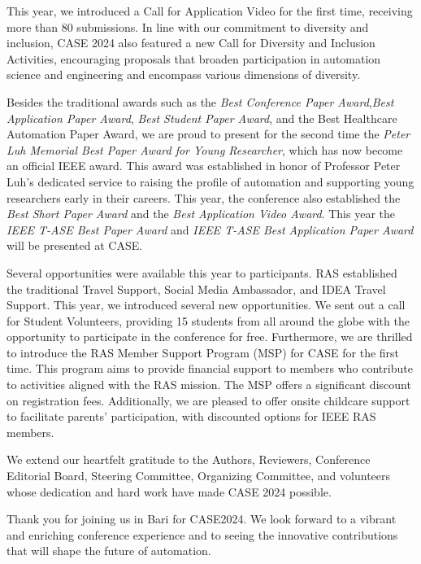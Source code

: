 \documentclass[
	openany, %
	parskip=full, %
	12pt, %
	a4paper, %
]{conferencebooklet} %
\begin{document}
This year, we introduced a Call for Application Video for the first time, receiving more than 80 submissions. In line with our commitment to diversity and inclusion, CASE 2024 also featured a new Call for Diversity and Inclusion Activities, encouraging proposals that broaden participation in automation science and engineering and encompass various dimensions of diversity.

Besides the traditional awards such as the \textit{Best Conference Paper Award},\textit{Best Application Paper Award}, \textit{Best Student Paper Award}, and the Best Healthcare Automation Paper Award, we are proud to present for the second time the \textit{Peter Luh Memorial Best Paper Award for Young Researcher}, which has now become an official IEEE award. This award was established in honor of Professor Peter Luh's dedicated service to raising the profile of automation and supporting young researchers early in their careers. This year, the conference also established the \textit{Best Short Paper Award} and the \textit{Best Application Video Award}. This year the \textit{IEEE T-ASE Best Paper Award} and \textit{IEEE T-ASE Best Application Paper Award} will be presented at CASE.



Several opportunities were available this year to participants. RAS established the traditional Travel Support, Social Media Ambassador, and IDEA Travel Support. This year, we introduced several new opportunities. We sent out a call for Student Volunteers, providing 15 students from all around the globe with the opportunity to participate in the conference for free. 
Furthermore, we are thrilled to introduce the RAS Member Support Program (MSP) for CASE for the first time. This program aims to provide financial support to members who contribute to activities aligned with the RAS mission. The MSP offers a significant discount on registration fees. Additionally, we are pleased to offer onsite childcare support to facilitate parents' participation, with discounted options for IEEE RAS members.

We extend our heartfelt gratitude to the Authors, Reviewers, Conference Editorial Board, Steering Committee, Organizing Committee, and volunteers whose dedication and hard work have made CASE 2024 possible. 

Thank you for joining us in Bari for CASE2024. We look forward to a vibrant and enriching conference experience and to seeing the innovative contributions that will shape the future of automation.
\end{document}
